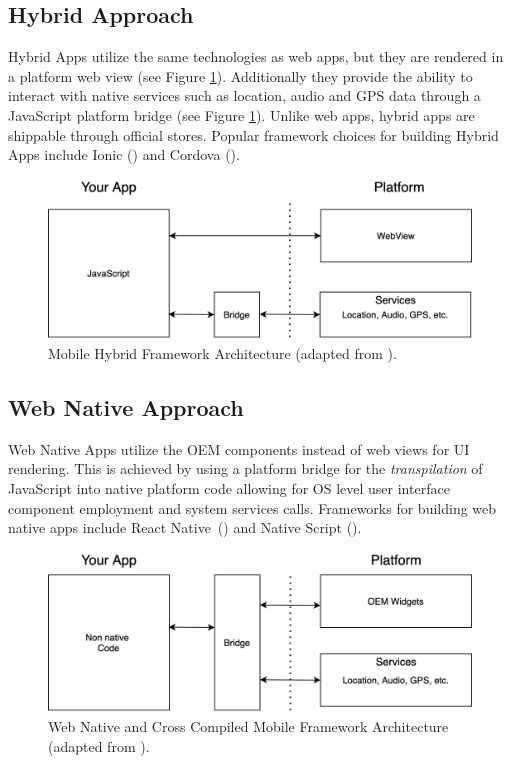 \subsection{Hybrid Approach}
Hybrid Apps utilize the same technologies as web apps, but they are rendered in a platform web view (see Figure \ref{fig:hybrid_architecture}). Additionally they provide the ability to 
interact with native services such as location, audio and GPS data through a JavaScript platform bridge (see Figure \ref{fig:hybrid_architecture}).
Unlike web apps, hybrid apps are shippable through official stores.
Popular framework choices for building Hybrid Apps include Ionic (\cite{Ionic2021}) and Cordova (\cite{Cordova2020}).

\begin{figure}
    \centering
    \includegraphics[width=.8\linewidth]{images/architectures/hybrid_architecture.png}
    \caption{Mobile Hybrid Framework Architecture (adapted from \cite{Cunha2018}).}
    \label{fig:hybrid_architecture}
\end{figure}

\subsection{Web Native Approach} \label{subsection::web_native_apps}
Web Native Apps utilize the OEM components instead of web views for UI rendering.
This is achieved by using a platform bridge for the \textit{transpilation} of JavaScript into native platform code allowing for OS level user interface component employment
and system services calls. 
Frameworks for building web native apps include React Native~(\cite{ReactNative2021}) and Native Script (\cite{NativeScript2021}).

\begin{figure}
    \centering
    \includegraphics[width=.8\linewidth]{images/architectures/native_web_app_architecture.png}
    \caption{Web Native and Cross Compiled Mobile Framework Architecture (adapted from \cite{Cunha2018}).}
    \label{fig:web_native_architecture}
\end{figure}

